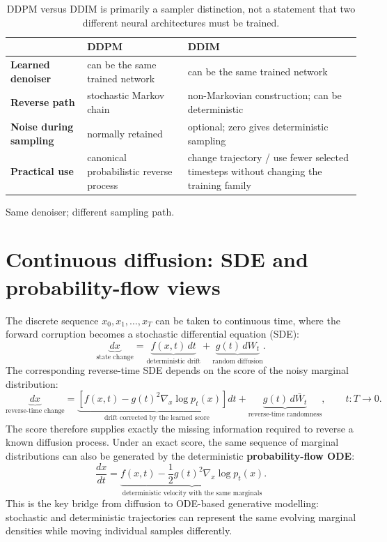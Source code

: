 \begin{table}[H]
\centering
\small
\begin{tabularx}{\linewidth}{>{\bfseries}l X X}
\toprule
 & DDPM & DDIM \\
\midrule
Learned denoiser & can be the same trained network & can be the same trained network \\
Reverse path & stochastic Markov chain & non-Markovian construction; can be deterministic \\
Noise during sampling & normally retained & optional; zero gives deterministic sampling \\
Practical use & canonical probabilistic reverse process & change trajectory / use fewer selected timesteps without changing the training family \\
\bottomrule
\end{tabularx}
\caption{DDPM versus DDIM is primarily a sampler distinction, not a statement that two different neural architectures must be trained.}
\label{tab:ddpm-ddim}
\end{table}

\begin{calloutmemoryhook}
Same denoiser; different sampling path.
\end{calloutmemoryhook}

\section{Continuous diffusion: SDE and probability-flow views}

The discrete sequence $x_0,x_1,\ldots,x_T$ can be taken to continuous time, where the forward corruption becomes a stochastic differential equation (SDE):
\[
\boxed{
\underbrace{dx}_{\text{state change}}
=
\underbrace{f(x,t)\,dt}_{\text{deterministic drift}}
+
\underbrace{g(t)\,dW_t}_{\text{random diffusion}}
}.
\]
The corresponding reverse-time SDE depends on the score of the noisy marginal distribution:
\[
\underbrace{dx}_{\text{reverse-time change}}
=
\underbrace{\left[f(x,t)-g(t)^2\nabla_x\log p_t(x)\right]dt}_{\text{drift corrected by the learned score}}
+
\underbrace{g(t)\,d\bar W_t}_{\text{reverse-time randomness}},
\qquad t:T\rightarrow0.
\]
The score therefore supplies exactly the missing information required to reverse a known diffusion process.
Under an exact score, the same sequence of marginal distributions can also be generated by the deterministic \textbf{probability-flow ODE}:
\[
\boxed{
\frac{dx}{dt}
=
\underbrace{f(x,t)-\frac{1}{2}g(t)^2\nabla_x\log p_t(x)}_{\text{deterministic velocity with the same marginals}}
}.
\]
This is the key bridge from diffusion to ODE-based generative modelling: stochastic and deterministic trajectories can represent the same evolving marginal densities while moving individual samples differently.

